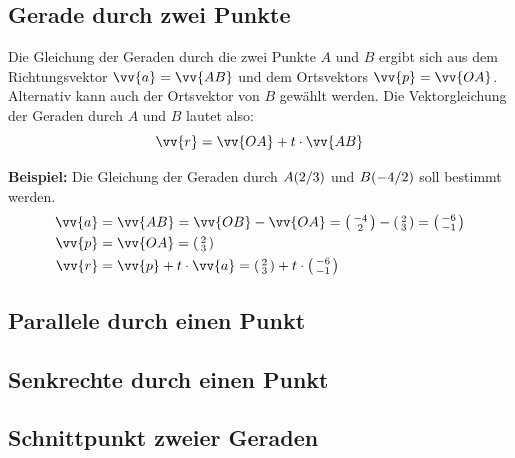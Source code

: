 \newpage
\subsection{Gerade durch zwei Punkte}

Die Gleichung der Geraden durch die zwei Punkte $A$ und $B$ ergibt sich aus dem
Richtungsvektor $\vv{a} = \vv{AB}$ und dem Ortsvektors $\vv{p} = \vv{OA}$.
Alternativ kann auch der Ortsvektor von $B$ gewählt werden. Die Vektorgleichung
der Geraden durch $A$ und $B$ lautet also:
\[
  \vv{r} = \vv{OA}+t\cdot \vv{AB}
\]
\begin{example}
  \textbf{Beispiel:} Die Gleichung der Geraden durch $\coord[A]{2,3}$ und
  $\coord[B]{-4,2}$ soll bestimmt werden.
  \begin{align*}
    \vv{a} &= \vv{AB} = \vv{OB}-\vv{OA} = \tvec{-4,2}-\tvec{2,3} = \tvec{-6,-1} \\
    \vv{p} &= \vv{OA} = \tvec{2,3} \\
    \vv{r} &= \vv{p}+t\cdot \vv{a} = \tvec{2,3}+t\cdot \tvec{-6,-1}
  \end{align*}
\end{example}
\subsection{Parallele durch einen Punkt}


\subsection{Senkrechte durch einen Punkt}

\subsection{Schnittpunkt zweier Geraden}
